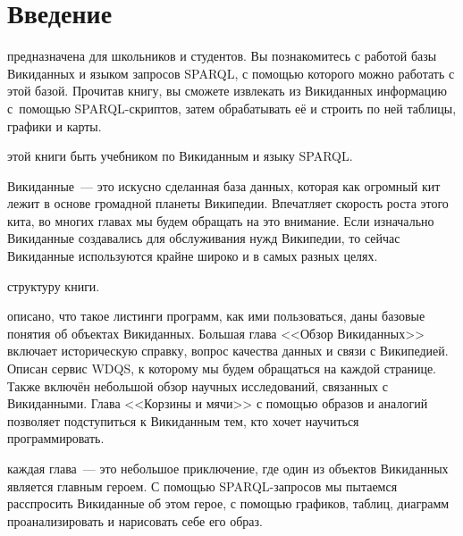 \chapter*{Введение}
\label{ch:intro}

 предназначена для школьников и студентов. 
Вы познакомитесь с работой базы Викиданных и языком запросов SPARQL, 
с помощью которого можно работать с этой базой. 
Прочитав книгу, вы сможете извлекать из Викиданных информацию с~помощью SPARQL-скриптов, 
затем обрабатывать её и строить по ней таблицы, графики и карты.

 этой книги быть учебником по Викиданным и языку SPARQL.

\vspace{4mm}

Викиданные~--- это искусно сделанная база данных, которая как огромный кит лежит в основе громадной планеты Википедии. 
Впечатляет скорость роста этого кита, во многих главах мы будем обращать на это внимание.
Если изначально Викиданные создавались для обслуживания нужд Википедии, 
то сейчас Викиданные используются крайне широко и в самых разных целях.

 структуру книги. 

 описано, 
что такое листинги программ, как ими пользоваться, даны базовые понятия об объектах Викиданных. 
Большая глава <<Обзор Викиданных>> включает историческую справку, 
вопрос качества данных и связи с Википедией. 
Описан сервис WDQS, к которому мы будем обращаться на каждой странице. 
Также включён небольшой обзор научных исследований, связанных с Викиданными. 
Глава <<Корзины и мячи>> с помощью образов и аналогий позволяет подступиться к Викиданным тем, 
кто хочет научиться программировать. 


каждая глава~--- это небольшое приключение, 
где один из объектов Викиданных является главным героем. 
С помощью SPARQL-запросов мы пытаемся расспросить Викиданные об этом герое, 
с помощью графиков, таблиц, диаграмм проанализировать и нарисовать себе его образ. 


